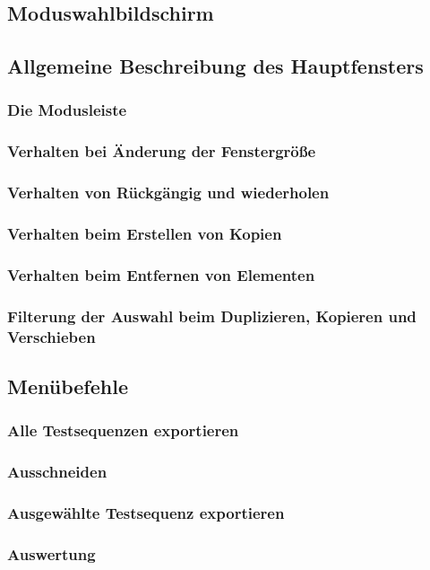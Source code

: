 \documentclass[a4paper,10pt]{scrartcl}
\begin{document}
\subsection{Moduswahlbildschirm}
\subsection{Allgemeine Beschreibung des Hauptfensters}
\subsubsection{Die Modusleiste}
\subsubsection{Verhalten bei Änderung der Fenstergröße}
\subsubsection{Verhalten von Rückgängig und wiederholen}
\subsubsection{Verhalten beim Erstellen von Kopien}
\subsubsection{Verhalten beim Entfernen von Elementen}
\subsubsection{Filterung der Auswahl beim Duplizieren, Kopieren und Verschieben}
\subsection{Menübefehle}
\subsubsection{Alle Testsequenzen exportieren}
\subsubsection{Ausschneiden}
\subsubsection{Ausgewählte Testsequenz exportieren}
\subsubsection{Auswertung}
\end{document}
